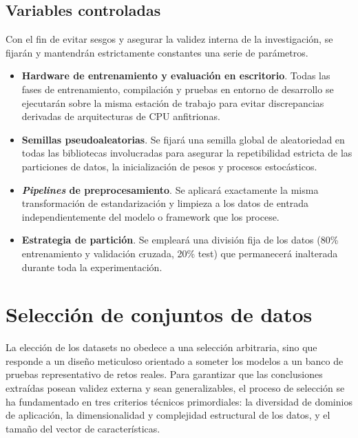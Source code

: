 \documentclass[a4paper,12pt,twoside,final]{book}
\begin{document}
\subsection{Variables controladas}
Con el fin de evitar sesgos y asegurar la validez interna de la investigación, se fijarán y mantendrán estrictamente
constantes una serie de parámetros.
\begin{itemize}
  \item \textbf{Hardware de entrenamiento y evaluación en escritorio}. Todas las fases de entrenamiento, compilación y
  pruebas en entorno de desarrollo se ejecutarán sobre la misma estación de trabajo para evitar discrepancias derivadas
  de arquitecturas de CPU anfitrionas.
  \item \textbf{Semillas pseudoaleatorias}. Se fijará una semilla global de aleatoriedad en todas las bibliotecas
  involucradas para asegurar la repetibilidad estricta de las particiones de datos, la inicialización de pesos y
  procesos estocásticos.
  \item \textbf{\textit{Pipelines} de preprocesamiento}. Se aplicará exactamente la misma transformación de
  estandarización y limpieza a los datos de entrada independientemente del modelo o framework que los procese.
  \item \textbf{Estrategia de partición}. Se empleará una división fija de los datos (80\% entrenamiento y validación
  cruzada, 20\% test) que permanecerá inalterada durante toda la experimentación.
\end{itemize}

\section{Selección de conjuntos de datos}
La elección de los datasets no obedece a una selección arbitraria, sino que responde a un diseño meticuloso orientado
a someter los modelos a un banco de pruebas representativo de retos reales. Para garantizar que las conclusiones
extraídas posean validez externa y sean generalizables, el proceso de selección se ha fundamentado en tres criterios
técnicos primordiales: la diversidad de dominios de aplicación, la dimensionalidad y complejidad estructural de los
datos, y el tamaño del vector de características.
\end{document}
